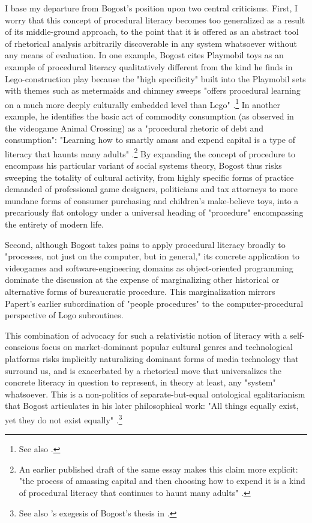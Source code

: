I base my departure from Bogost's position upon two central criticisms. First, I worry that this concept of procedural literacy becomes too generalized as a result of its middle-ground approach, to the point that it is offered as an abstract tool of rhetorical analysis arbitrarily discoverable in any system whatsoever without any means of evaluation. In one example, Bogost cites Playmobil toys as an example of procedural literacy qualitatively different from the kind he finds in Lego-construction play because the "high specificity" built into the Playmobil sets with themes such as metermaids and chimney sweeps "offers procedural learning on a much more deeply culturally embedded level than Lego" \autocite[256]{Bogost2007-ow}.\footnote{
  See also \autocite{BogostPlaymobil}.
 } In another example, he identifies the basic act of commodity consumption (as observed in the videogame Animal Crossing) as a "procedural rhetoric of debt and consumption": "Learning how to smartly amass and expend capital is a type of literacy that haunts many adults" \autocite[268]{Bogost2007-ow}.\footnote{
  An earlier published draft of the same essay makes this claim more explicit: "the process of amassing capital and then choosing how to expend it is a kind of procedural literacy that continues to haunt many adults" \autocite[36]{Bogost2005}.
}
By expanding the concept of procedure to encompass his particular variant of social systems theory, Bogost thus risks sweeping the totality of cultural activity, from highly specific forms of practice demanded of professional game designers, politicians and tax attorneys to more mundane forms of consumer purchasing and children's make-believe toys, into a precariously flat ontology under a universal heading of "procedure" encompassing the entirety of modern life.

Second, although Bogost takes pains to apply procedural literacy broadly to "processes, not just on the computer, but in general," its concrete application to videogames and software-engineering domains as object-oriented programming dominate the discussion at the expense of marginalizing other historical or alternative forms of bureaucratic procedure. This marginalization mirrors Papert's earlier subordination of "people procedures" to the computer-procedural perspective of Logo subroutines.

This combination of advocacy for such a relativistic notion of literacy with a self-conscious focus on market-dominant popular cultural genres and technological platforms risks implicitly naturalizing dominant forms of media technology that surround us, and is exacerbated by a rhetorical move that universalizes the concrete literacy in question to represent, in theory at least, any "system" whatsoever. This is a non-politics of separate-but-equal ontological egalitarianism that Bogost articulates in his later philosophical work: "All things equally exist, yet they do not exist equally" \autocite{BogostMaterialisms}.\footnote{ See also \citeauthor{Bryant2011}'s exegesis of Bogost's thesis in  \autocite[279--90]{Bryant2011}.}

